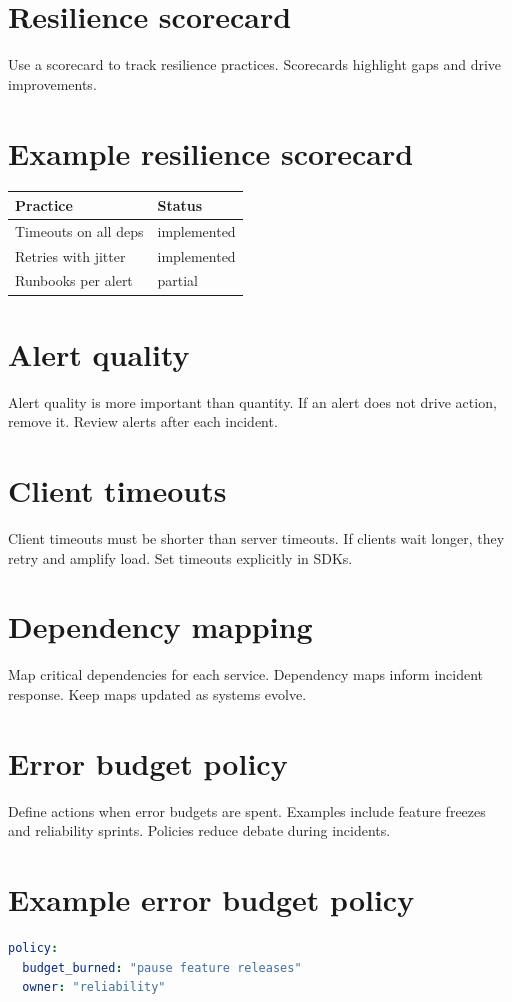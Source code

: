 \section{Resilience scorecard}
Use a scorecard to track resilience practices.
Scorecards highlight gaps and drive improvements.

\section{Example resilience scorecard}
\begin{tabularx}{\textwidth}{@{}lX@{}}
\toprule
Practice & Status \\
\midrule
Timeouts on all deps & implemented \\
Retries with jitter & implemented \\
Runbooks per alert & partial \\
\bottomrule
\end{tabularx}

\section{Alert quality}
Alert quality is more important than quantity.
If an alert does not drive action, remove it.
Review alerts after each incident.

\section{Client timeouts}
Client timeouts must be shorter than server timeouts.
If clients wait longer, they retry and amplify load.
Set timeouts explicitly in SDKs.

\section{Dependency mapping}
Map critical dependencies for each service.
Dependency maps inform incident response.
Keep maps updated as systems evolve.

\section{Error budget policy}
Define actions when error budgets are spent.
Examples include feature freezes and reliability sprints.
Policies reduce debate during incidents.

\section{Example error budget policy}
\begin{lstlisting}[language=YAML]
policy:
  budget_burned: "pause feature releases"
  owner: "reliability"
\end{lstlisting}

